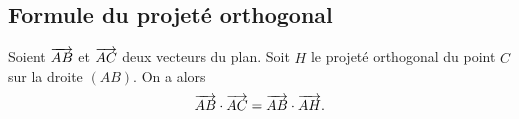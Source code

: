 \documentclass[11pt]{article}
\begin{document}
\subsection{Formule du projeté orthogonal}
\begin{prop}
  \begin{minipage}{.7\textwidth}
  Soient $\overrightarrow{AB}$ et $\overrightarrow{AC}$ deux vecteurs du plan. Soit $H$ le projeté
  orthogonal du point $C$ sur la droite $(AB)$. On a alors
  \[
    \overrightarrow{AB}\cdot\overrightarrow{AC}=\overrightarrow{AB}\cdot\overrightarrow{AH}.
  \]
  \end{minipage}
  \begin{minipage}{.3\textwidth}
    \begin{center}
    \end{center}
  \end{minipage}
\end{prop}
\end{document}
